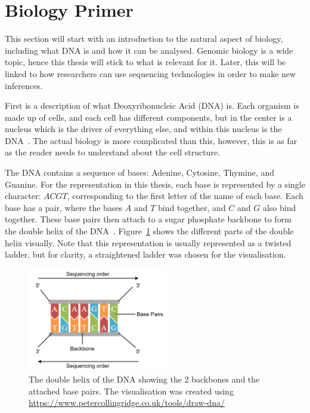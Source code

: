 \section{Biology Primer}\label{sec:Biology}

This section will start with an introduction to the natural aspect of biology, including what DNA is and how it can be analysed.
Genomic biology is a wide topic, hence this thesis will stick to what is relevant for it.
Later, this will be linked to how researchers can use sequencing technologies in order to make new inferences.

First is a description of what Deoxyribonucleic Acid (DNA) is.
Each organism is made up of cells, and each cell has different components, but in the center is a nucleus which is the driver of everything else, and within this nucleus is the DNA~\cite{CellBiology}.\@
The actual biology is more complicated than this, however, this is as far as the reader needs to understand about the cell structure.

The DNA contains a sequence of bases: Adenine, Cytosine, Thymine, and Guanine.
For the representation in this thesis, each base is represented by a single character: $ACGT$, corresponding to the first letter of the name of each base.
Each base has a pair, where the bases $A$ and $T$ bind together, and $C$ and $G$ also bind together.
These base pairs then attach to a sugar phosphate backbone to form the double helix of the DNA~\cite{DNA}.
Figure~\ref{fig:DoubleHelix} shows the different parts of the double helix visually.
Note that this representation is usually represented as a twisted ladder, but for clarity, a straightened ladder was chosen for the visualisation.

\begin{figure}[t]
  \centering
  \includegraphics[width=0.55\textwidth]{images/DoubleHelix.png}
  \caption{The double helix of the DNA showing the 2 backbones and the attached base pairs. The visualisation was created using \url{https://www.petercollingridge.co.uk/tools/draw-dna/}}\label{fig:DoubleHelix}
\end{figure}

